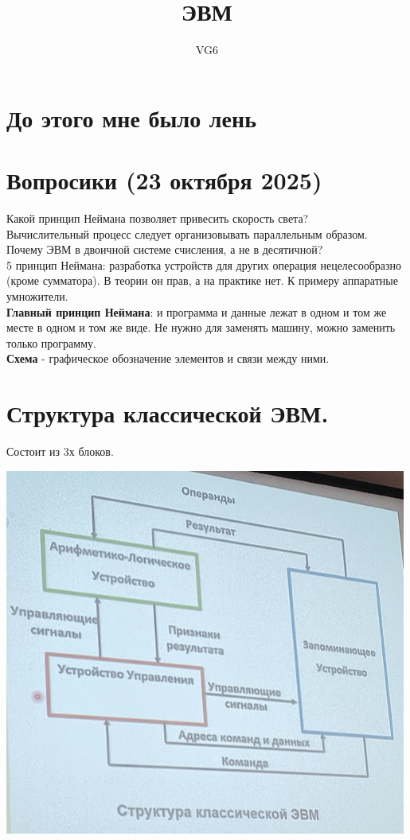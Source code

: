 \documentclass[12px]{article}
\title{ЭВМ}
\author{VG6}
\begin{document}
\maketitle

\section{До этого мне было лень}
\section*{Вопросики (23 октября 2025)}
Какой принцип Неймана позволяет привесить скорость света?\\
Вычислительный процесс следует организовывать параллельным образом.\\
Почему ЭВМ в двоичной системе счисления, а не в десятичной?\\
5 принцип Неймана: разработка устройств для других операция нецелесообразно (кроме сумматора). В теории он прав, а на практике нет. К примеру аппаратные умножители. \\
\textbf{Главный принцип Неймана}: и программа и данные лежат в одном и том же месте в одном и том же виде. Не нужно для заменять машину, можно заменить только программу. \\
\textbf{Схема} - графическое обозначение элементов и связи между ними. \\

\section{Структура классической ЭВМ.}
Состоит из 3х блоков.
\begin{center}
\includegraphics[width=0.7\linewidth]{images/Схема ЭВМ.png}
\end{center}
\end{document}
